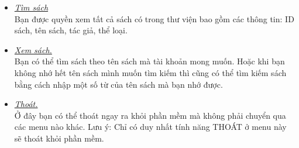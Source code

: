\documentclass[16pt,a4paper,oneside]{article}
\begin{document}
\begin{itemize}
\begin{itemize}
	\end{itemize}
	\item \underline{\textit{Tìm sách}}\\
		Bạn được quyền xem tất cả sách có trong thư viện bao gồm các thông tin: ID sách, tên sách, tác giả, thể loại.
	\item \underline{\textit{Xem sách.}}\\
	Bạn có thể tìm sách theo tên sách mà tài khoản mong muốn. Hoặc khi bạn không nhớ hết tên sách mình muốn tìm kiếm thì cũng có thể tìm kiếm sách bằng cách nhập một số từ của tên sách mà bạn nhớ được.
	\item \underline{\textit{Thoát.}}\\
	Ở đây bạn có thể thoát ngay ra khỏi phần mềm mà không phải chuyển qua các menu nào khác. Lưu ý: Chỉ có duy nhất tính năng THOÁT ở menu này sẽ thoát khỏi phần mềm.
\end{itemize}
\end{document}
